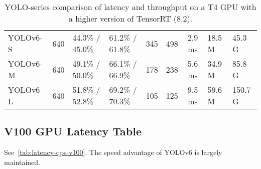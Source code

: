 \documentclass[10pt,twocolumn,letterpaper]{article}
\begin{document}
\begin{table}[ht]
{\begin{tabular}{l|HHHc|c|cHH}
      YOLOv6-S & 640 & 44.3\% / 45.0\% & 61.2\% / 61.8\% & 345 & 498 &2.9 ms & 18.5 M & 45.3 G \\
      YOLOv6-M & 640 & 49.1\% / 50.0\% & 66.1\% / 66.9\% & 178 & 238 & 5.6 ms & 34.9 M & 85.8 G \\
      YOLOv6-L & 640 & 51.8\% / 52.8\% & 69.2\% / 70.3\% & 105 & 125 & 9.5 ms & 59.6 M & 150.7 G \\
      \bottomrule
		\end{tabular}
	}
	\caption{
    YOLO-series comparison of latency and throughput on a T4 GPU with a higher version of TensorRT (8.2).
	}
	\label{tab:latency-qps-trt82}
\end{table}

\subsection{V100 GPU Latency Table}
See~\cref{tab:latency-qps-v100}. The speed advantage of YOLOv6 is largely maintained.
\end{document}
